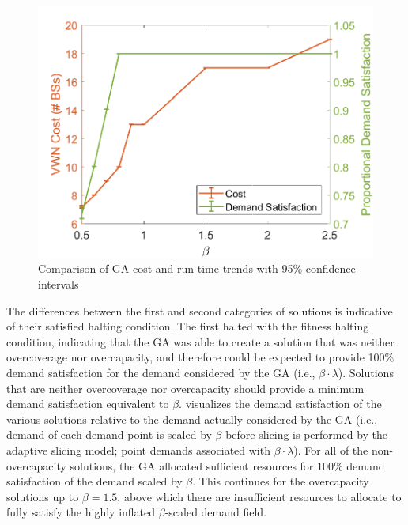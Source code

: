 \documentclass[12pt,dvipsnames]{report}
\begin{document}
\begin{figure}[htp]
	\centering
	\includegraphics[height=0.4\textheight]{Figures/CaseI_GAComparisonCostSat}
	\caption[Comparison of Case I GA approach cost and demand satisfaction]{Comparison of GA cost and run time trends with 95\% confidence intervals}
	\label{fig:CaseI_GAComparisonCostSat}
\end{figure}

The differences between the first and second categories of solutions is indicative of their satisfied halting condition.  The first halted with the fitness halting condition, indicating that the GA was able to create a solution that was neither overcoverage nor overcapacity, and therefore could be expected to provide 100\% demand satisfaction for the demand considered by the GA (i.e., $\beta \cdot \lambda$).  Solutions that are neither overcoverage nor overcapacity should provide a minimum demand satisfaction equivalent to $\beta$.   visualizes the demand satisfaction of the various solutions relative to the demand actually considered by the GA (i.e., demand of each demand point is scaled by $\beta$ before slicing is performed by the adaptive slicing model; point demands associated with $\beta \cdot \lambda$).  For all of the non-overcapacity solutions, the GA allocated sufficient resources for 100\% demand satisfaction of the demand scaled by $\beta$.  This continues for the overcapacity solutions up to $\beta = 1.5$, above which there are insufficient resources to allocate to fully satisfy the highly inflated $\beta$-scaled demand field.
\end{document}
